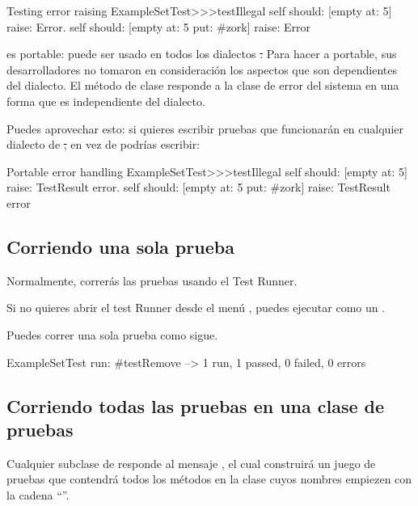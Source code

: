 \documentclass[a4paper,10pt,twoside]{book}
\begin{document}
\begin{method}[ESTtestIllegal]{Testing error raising}
ExampleSetTest>>>testIllegal
	self should: [empty at: 5] raise: Error.
	self should: [empty at: 5 put: #zork] raise: Error
\end{method}

\sunit es portable: puede ser usado en todos los dialectos \st.  Para hacer a \sunit portable,
sus desarrolladores no tomaron en consideraci\'on los aspectos que son dependientes
del dialecto. El m\'etodo de clase  responde a la clase
de error del sistema en una forma que es independiente del dialecto.

Puedes aprovechar esto: si quieres escribir pruebas que funcionar\'an en cualquier dialecto de \st, en vez de
 podr\'ias escribir:

\begin{method}[portabletestillegal]{Portable error handling}
ExampleSetTest>>>testIllegal
	self should: [empty at: 5] raise: TestResult error.
	self should: [empty at: 5 put: #zork] raise: TestResult error
\end{method}


\subsection{Corriendo una sola prueba}
Normalmente, correr\'as las pruebas usando el Test Runner.

Si no quieres abrir el test Runner desde el men\'u ,
puedes ejecutar  como un .

Puedes correr una sola prueba como sigue.

\begin{code}{}
ExampleSetTest run: #testRemove --> 1 run, 1 passed, 0 failed, 0 errors
\end{code}

\subsection{Corriendo todas las pruebas en una clase de pruebas}

Cualquier subclase de  responde al mensaje , el cual
construir\'a un juego de pruebas que contendr\'a todos los
m\'etodos en la clase cuyos nombres empiezen con la cadena ``''.
\end{document}
